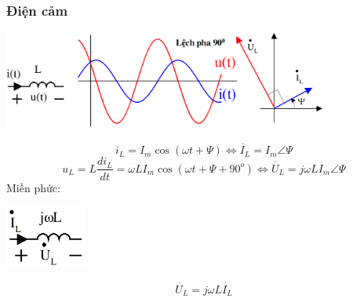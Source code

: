 \subsubsection{Điện cảm}
\begin{center}
    \includegraphics[width = 0.8\textwidth]{./image/39.png}
\end{center}
\begin{equation}
    i_L = I_m \cos (\omega t + \varPsi) \Leftrightarrow \dot{I_L} = I_m \angle \varPsi
\end{equation}
\begin{equation}
    u_L = L \frac{di_L}{dt} = \omega L I_m \cos (\omega t + \varPsi + 90^o) \Leftrightarrow \dot{U_L} = j\omega L I_m \angle \varPsi
\end{equation}
Miền phức:
\begin{center}
    \includegraphics[width = 0.2\textwidth]{./image/40.png}
\end{center}
\begin{equation}
    \dot{U_L} = j\omega L \dot{I_L}
\end{equation}
